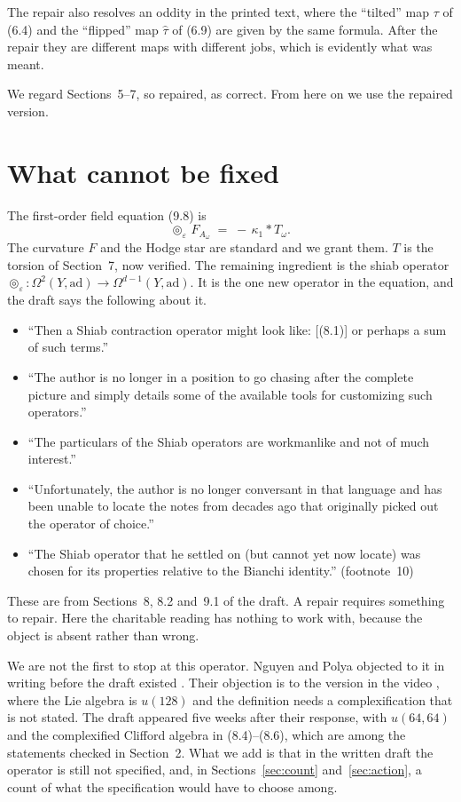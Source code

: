 \documentclass[11pt]{article}
\theoremstyle{remark}
\newcommand{\eps}{\varepsilon}
\newcommand{\Sh}{\circledcirc}
\begin{document}
The repair also resolves an oddity in the printed text, where the ``tilted'' map $\tau$ of
(6.4) and the ``flipped'' map $\hat\tau$ of (6.9) are given by the same formula. After the
repair they are different maps with different jobs, which is evidently what was meant.

We regard Sections~5--7, so repaired, as correct. From here on we use the repaired version.

\section{What cannot be fixed}

The first-order field equation (9.8) is
\[
\Sh_\eps\, F_{A_\omega} \;=\; -\,\kappa_1 *T_\omega .
\]
The curvature $F$ and the Hodge star are standard \cite{KN,LM} and we grant them. $T$ is the torsion of
Section~7, now verified. The remaining ingredient is the shiab operator
$\Sh_\eps:\Omega^2(Y,\mathrm{ad})\to\Omega^{d-1}(Y,\mathrm{ad})$. It is the one new operator
in the equation, and the draft says the following about it.

\begin{itemize}
\item ``Then a Shiab contraction operator might look like: [(8.1)] or perhaps a sum of such
terms.''
\item ``The author is no longer in a position to go chasing after the complete picture and
simply details some of the available tools for customizing such operators.''
\item ``The particulars of the Shiab operators are workmanlike and not of much interest.''
\item ``Unfortunately, the author is no longer conversant in that language and has been unable
to locate the notes from decades ago that originally picked out the operator of choice.''
\item ``The Shiab operator that he settled on (but cannot yet now locate) was chosen for its
properties relative to the Bianchi identity.'' (footnote~10)
\end{itemize}

These are from Sections~8, 8.2 and~9.1 of the draft. A repair requires something to repair.
Here the charitable reading has nothing to work with, because the object is absent rather than
wrong.

We are not the first to stop at this operator. Nguyen and Polya objected to it in writing
before the draft existed \cite[Section~3.1]{NP}. Their objection is to the version in the video
\cite{Video}, where the Lie algebra is $u(128)$ and the definition needs a complexification
that is not stated. The draft appeared five weeks after their response, with $u(64,64)$ and the
complexified Clifford algebra in (8.4)--(8.6), which are among the statements checked in
Section~2. What we add is that in the written draft the operator is still not specified, and,
in Sections~\ref{sec:count} and~\ref{sec:action}, a count of what the specification would have
to choose among.
\end{document}
